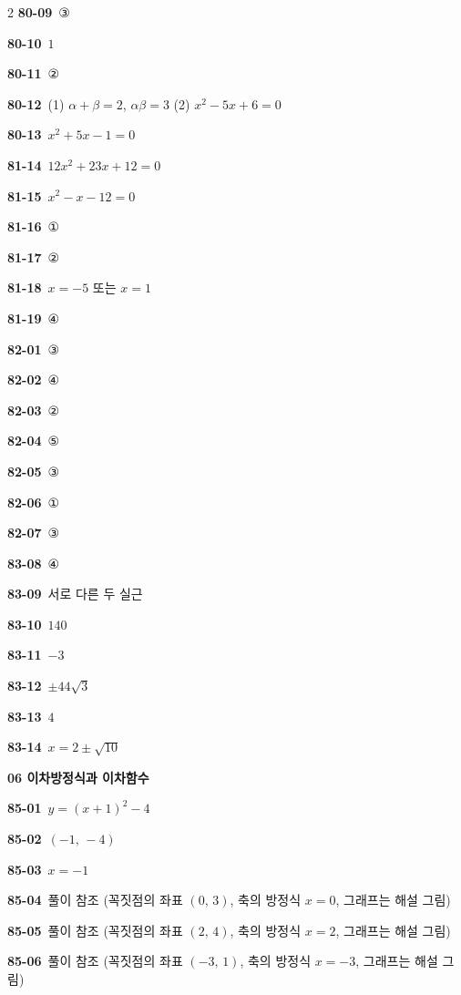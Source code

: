\documentclass[10pt,a4paper]{article}
\begin{document}
\begin{multicols}{2}
\noindent\textbf{80-09}\ ③\par
\noindent\textbf{80-10}\ $1$\par
\noindent\textbf{80-11}\ ②\par
\noindent\textbf{80-12}\ (1) $\alpha+\beta=2$, $\alpha\beta=3$ (2) $x^2-5x+6=0$\par
\noindent\textbf{80-13}\ $x^2+5x-1=0$\par
\noindent\textbf{81-14}\ $12x^2+23x+12=0$\par
\noindent\textbf{81-15}\ $x^2-x-12=0$\par
\noindent\textbf{81-16}\ ①\par
\noindent\textbf{81-17}\ ②\par
\noindent\textbf{81-18}\ $x=-5$ 또는 $x=1$\par
\noindent\textbf{81-19}\ ④\par
\noindent\textbf{82-01}\ ③\par
\noindent\textbf{82-02}\ ④\par
\noindent\textbf{82-03}\ ②\par
\noindent\textbf{82-04}\ ⑤\par
\noindent\textbf{82-05}\ ③\par
\noindent\textbf{82-06}\ ①\par
\noindent\textbf{82-07}\ ③\par
\noindent\textbf{83-08}\ ④\par
\noindent\textbf{83-09}\ 서로 다른 두 실근\par
\noindent\textbf{83-10}\ $140$\par
\noindent\textbf{83-11}\ $-3$\par
\noindent\textbf{83-12}\ $\pm 44\sqrt{3}$\par
\noindent\textbf{83-13}\ $4$\par
\noindent\textbf{83-14}\ $x=2\pm\sqrt{10}$\par
\noindent\textbf{06 이차방정식과 이차함수}\par\smallskip
\noindent\textbf{85-01}\ $y=(x+1)^2-4$\par
\noindent\textbf{85-02}\ $(-1,\,-4)$\par
\noindent\textbf{85-03}\ $x=-1$\par
\noindent\textbf{85-04}\ 풀이 참조 (꼭짓점의 좌표 $(0,\,3)$, 축의 방정식 $x=0$, 그래프는 해설 그림)\par
\noindent\textbf{85-05}\ 풀이 참조 (꼭짓점의 좌표 $(2,\,4)$, 축의 방정식 $x=2$, 그래프는 해설 그림)\par
\noindent\textbf{85-06}\ 풀이 참조 (꼭짓점의 좌표 $(-3,\,1)$, 축의 방정식 $x=-3$, 그래프는 해설 그림)\par

\end{multicols}
\end{document}
